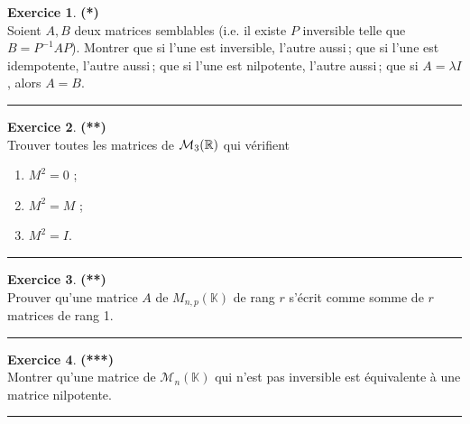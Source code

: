 \documentclass[a4paper,11pt]{article}
\theoremstyle{definition}
\newtheorem{exo}{Exercice} %
\begin{document}
\begin{minipage}{1\linewidth}\begin{minipage}[t]{0.48\linewidth}\raggedright
		
		
		\begin{exo}\textbf{(*)}\quad\\[0.2cm]
			Soient $A, B$ deux matrices semblables (i.e. il existe $P$
			inversible telle que $B = P^{-1} A P$). Montrer que si l'une est
			inversible, l'autre aussi\,; que si l'une est idempotente, l'autre
			aussi\,; que si l'une est nilpotente, l'autre aussi\,; que si $A =
			\lambda I$, alors $A = B$.
			
			\centering\rule{1\linewidth}{0.6pt}\end{exo}
		
			\begin{exo}\textbf{(**)}\quad\\[0.2cm]
			Trouver toutes les matrices de $\mathcal{M}_3(\mathbb{R})$ qui vérifient
			\begin{enumerate}
				\item $M^2 = 0$ ;
				\item $M^2 = M$ ; 
				\item $M^2 = I$. 
			\end{enumerate}
			
			\centering\rule{1\linewidth}{0.6pt}\end{exo}
		
		
		
		
		\begin{exo}\textbf{(**)}\quad\\[0.2cm]
			Prouver qu'une matrice $A$ de $M_{n,p}(\mathbb K)$ de rang $r$ s'écrit comme somme de $r$ matrices de rang 1.
			
			\centering\rule{1\linewidth}{0.6pt}\end{exo}
		
			\begin{exo}\textbf{(***)}\quad\\[0.2cm]
				Montrer qu'une matrice de $\mathcal M_n(\mathbb K)$ qui n'est pas inversible est équivalente à une matrice nilpotente.
				
				\centering\rule{1\linewidth}{0.6pt}\end{exo}
		
		
	\end{minipage}\hfill\vrule\hfill\begin{minipage}[t]{0.48\linewidth}\raggedright
		

\end{minipage}
\end{minipage}
\end{document}
